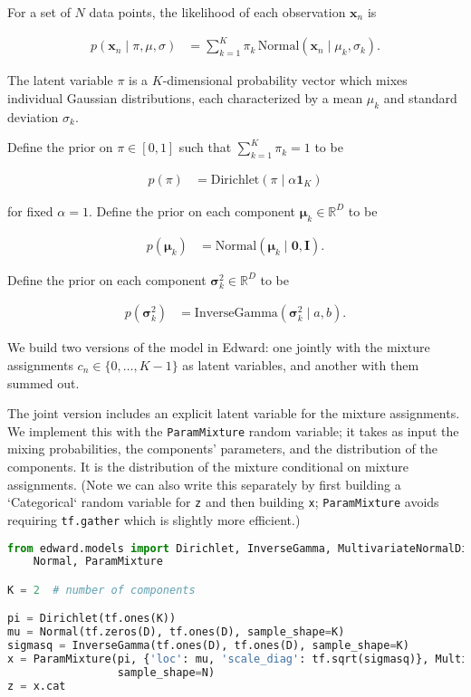 For a set of $N$ data points,
the likelihood of each observation $\mathbf{x}_n$ is

\begin{align*}
  p(\mathbf{x}_n \mid \pi, \mu, \sigma)
  &=
  \sum_{k=1}^K \pi_k \, \text{Normal}(\mathbf{x}_n \mid \mu_k, \sigma_k).
\end{align*}

The latent variable $\pi$ is a $K$-dimensional probability vector
which mixes individual Gaussian distributions, each
characterized by a mean $\mu_k$ and standard deviation $\sigma_k$.

Define the prior on $\pi\in[0,1]$ such that $\sum_{k=1}^K\pi_k=1$ to be

\begin{align*}
  p(\pi)
  &=
  \text{Dirichlet}(\pi \mid \alpha \mathbf{1}_{K})
\end{align*}

for fixed $\alpha=1$. Define the prior on each component $\mathbf{\mu}_k\in\mathbb{R}^D$ to be

\begin{align*}
  p(\mathbf{\mu}_k)
  &=
  \text{Normal}(\mathbf{\mu}_k \mid \mathbf{0}, \mathbf{I}).
\end{align*}

Define the prior on each component $\mathbf{\sigma}_k^2\in\mathbb{R}^D$ to be

\begin{align*}
  p(\mathbf{\sigma}_k^2)
  &=
  \text{InverseGamma}(\mathbf{\sigma}_k^2 \mid a, b).
\end{align*}

We build two versions of the model in Edward: one jointly with the
mixture assignments $c_n\in\{0,\ldots,K-1\}$ as latent variables,
and another with them summed out.

The joint version includes an explicit latent variable for the mixture
assignments. We implement this with the \texttt{ParamMixture} random
variable; it takes as input the mixing probabilities, the components'
parameters, and the distribution of the components. It is the
distribution of the mixture conditional on mixture assignments. (Note
we can also write this separately by first building a `Categorical`
random variable for \texttt{z} and then building \texttt{x}; \texttt{ParamMixture} avoids
requiring \texttt{tf.gather} which is slightly more efficient.)

\begin{lstlisting}[language=Python]
from edward.models import Dirichlet, InverseGamma, MultivariateNormalDiag, \
    Normal, ParamMixture

K = 2  # number of components

pi = Dirichlet(tf.ones(K))
mu = Normal(tf.zeros(D), tf.ones(D), sample_shape=K)
sigmasq = InverseGamma(tf.ones(D), tf.ones(D), sample_shape=K)
x = ParamMixture(pi, {'loc': mu, 'scale_diag': tf.sqrt(sigmasq)}, MultivariateNormalDiag,
                 sample_shape=N)
z = x.cat
\end{lstlisting}

